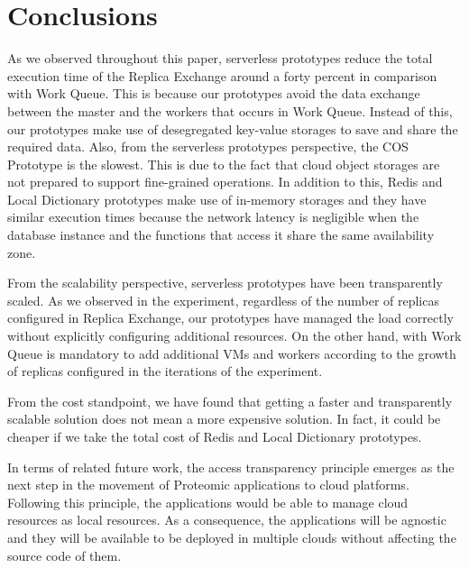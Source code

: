 \documentclass[sigplan, screen]{acmart}
\begin{document}
\section{Conclusions}
As we observed throughout this paper, serverless prototypes reduce the total execution time of the Replica Exchange around a forty percent in comparison with Work Queue. This is because our prototypes avoid the data exchange between the master and the workers that occurs in Work Queue. Instead of this, our prototypes make use of desegregated key-value storages to save and share the required data. Also, from the serverless prototypes perspective, the COS Prototype is the slowest. This is due to the fact that cloud object storages are not prepared to support fine-grained operations. In addition to this, Redis and Local Dictionary prototypes make use of in-memory storages and they have similar execution times because the network latency is negligible when the database instance and the functions that access it share the same availability zone.

From the scalability perspective, serverless prototypes have been transparently scaled. As we observed in the experiment, regardless of the number of replicas configured in Replica Exchange, our prototypes have managed the load correctly without explicitly configuring additional resources. On the other hand, with Work Queue is mandatory to add additional VMs and workers according to the growth of replicas configured in the iterations of the experiment.

From the cost standpoint, we have found that getting a faster and transparently scalable solution does not mean a more expensive solution. In fact, it could be cheaper if we take the total cost of Redis and Local Dictionary prototypes.

In terms of related future work, the access transparency principle emerges as the next step in the movement of Proteomic applications to cloud platforms. Following this principle, the applications would be able to manage cloud resources as local resources. As a consequence, the applications will be agnostic and they will be available to be deployed in multiple clouds without affecting the source code of them.


\nocite{GarcaLpez2020ServerlessEG}
\nocite{wqFolding}

\label{sec:conclusions}


\medskip


\end{document}

